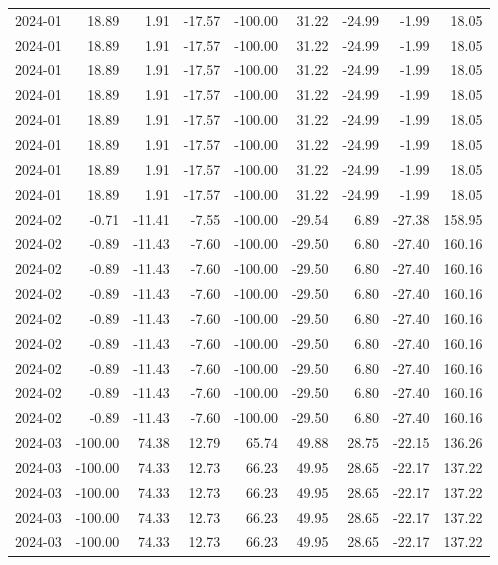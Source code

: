 \begin{table}[ht]
\begin{tabular}{lrrrrrrrr}
  2024-01 & 18.89 & 1.91 & -17.57 & -100.00 & 31.22 & -24.99 & -1.99 & 18.05 \\ 
  2024-01 & 18.89 & 1.91 & -17.57 & -100.00 & 31.22 & -24.99 & -1.99 & 18.05 \\ 
  2024-01 & 18.89 & 1.91 & -17.57 & -100.00 & 31.22 & -24.99 & -1.99 & 18.05 \\ 
  2024-01 & 18.89 & 1.91 & -17.57 & -100.00 & 31.22 & -24.99 & -1.99 & 18.05 \\ 
  2024-01 & 18.89 & 1.91 & -17.57 & -100.00 & 31.22 & -24.99 & -1.99 & 18.05 \\ 
  2024-01 & 18.89 & 1.91 & -17.57 & -100.00 & 31.22 & -24.99 & -1.99 & 18.05 \\ 
  2024-01 & 18.89 & 1.91 & -17.57 & -100.00 & 31.22 & -24.99 & -1.99 & 18.05 \\ 
  2024-01 & 18.89 & 1.91 & -17.57 & -100.00 & 31.22 & -24.99 & -1.99 & 18.05 \\ 
  2024-02 & -0.71 & -11.41 & -7.55 & -100.00 & -29.54 & 6.89 & -27.38 & 158.95 \\ 
  2024-02 & -0.89 & -11.43 & -7.60 & -100.00 & -29.50 & 6.80 & -27.40 & 160.16 \\ 
  2024-02 & -0.89 & -11.43 & -7.60 & -100.00 & -29.50 & 6.80 & -27.40 & 160.16 \\ 
  2024-02 & -0.89 & -11.43 & -7.60 & -100.00 & -29.50 & 6.80 & -27.40 & 160.16 \\ 
  2024-02 & -0.89 & -11.43 & -7.60 & -100.00 & -29.50 & 6.80 & -27.40 & 160.16 \\ 
  2024-02 & -0.89 & -11.43 & -7.60 & -100.00 & -29.50 & 6.80 & -27.40 & 160.16 \\ 
  2024-02 & -0.89 & -11.43 & -7.60 & -100.00 & -29.50 & 6.80 & -27.40 & 160.16 \\ 
  2024-02 & -0.89 & -11.43 & -7.60 & -100.00 & -29.50 & 6.80 & -27.40 & 160.16 \\ 
  2024-02 & -0.89 & -11.43 & -7.60 & -100.00 & -29.50 & 6.80 & -27.40 & 160.16 \\ 
  2024-03 & -100.00 & 74.38 & 12.79 & 65.74 & 49.88 & 28.75 & -22.15 & 136.26 \\ 
  2024-03 & -100.00 & 74.33 & 12.73 & 66.23 & 49.95 & 28.65 & -22.17 & 137.22 \\ 
  2024-03 & -100.00 & 74.33 & 12.73 & 66.23 & 49.95 & 28.65 & -22.17 & 137.22 \\ 
  2024-03 & -100.00 & 74.33 & 12.73 & 66.23 & 49.95 & 28.65 & -22.17 & 137.22 \\ 
  2024-03 & -100.00 & 74.33 & 12.73 & 66.23 & 49.95 & 28.65 & -22.17 & 137.22 \\ 

\end{tabular}
\end{table}
